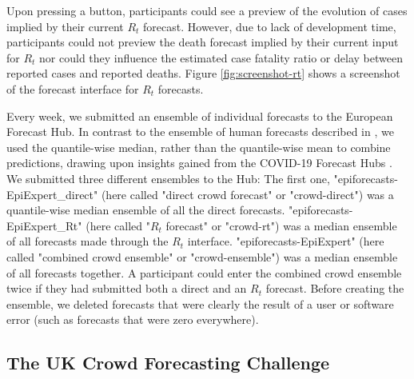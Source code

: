 \documentclass[10pt,a4paper,twocolumn]{article}
\begin{document}
Upon pressing a button, participants could see a preview of the evolution of cases implied by their current $R_t$ forecast. However, due to lack of development time, participants could not preview the death forecast implied by their current input for $R_t$ nor could they influence the estimated case fatality ratio or delay between reported cases and reported deaths. Figure \ref{fig:screenshot-rt} shows a screenshot of the forecast interface for $R_t$ forecasts. 

Every week, we submitted an ensemble of individual forecasts to the European Forecast Hub. In contrast to the ensemble of human forecasts described in \citet{bosseComparingHumanModelbased2022}, we used the quantile-wise median, rather than the quantile-wise mean to combine predictions, drawing upon insights gained from the COVID-19 Forecast Hubs \citep{rayComparingTrainedUntrained2022}. 
We submitted three different ensembles to the Hub: The first one, "epiforecasts-EpiExpert\_direct" (here called "direct crowd forecast" or "crowd-direct") was a quantile-wise median ensemble of all the direct forecasts. "epiforecasts-EpiExpert\_Rt" (here called "$R_t$ forecast" or "crowd-rt") was a median ensemble of all forecasts made through the $R_t$ interface. "epiforecasts-EpiExpert" (here called "combined crowd ensemble" or "crowd-ensemble") was a median ensemble of all forecasts together. A participant could enter the combined crowd ensemble twice if they had submitted both a direct and an $R_t$ forecast. Before creating the ensemble, we deleted forecasts that were clearly the result of a user or software error (such as forecasts that were zero everywhere).

\subsection*{The UK Crowd Forecasting Challenge}
\end{document}
